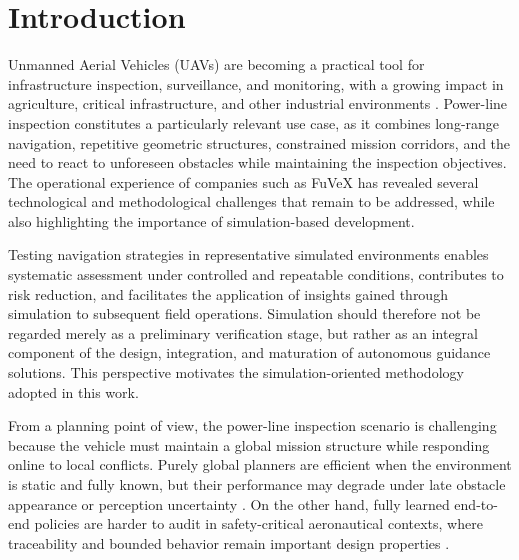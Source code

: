 \documentclass[electronics,article,submit,moreauthors]{Definitions/mdpi}
\DeclareRobustCommand{\deleted}[1]{}%
\DeclareRobustCommand{\added}[1]{#1}%
\DeclareRobustCommand{\deleted}[1]{\textcolor{black}{\sout{#1}}}
\DeclareRobustCommand{\added}[1]{\textcolor{green!50!black}{#1}}
\def\deleted#1{}%
\def\added#1{#1}%
\begin{document}
\section{Introduction}

Unmanned Aerial Vehicles (UAVs) are becoming a practical tool for infrastructure inspection, surveillance, and monitoring, with a growing impact in agriculture, critical infrastructure, and other industrial environments \cite{imran2025environmental,marut2024surveillance}. Power-line inspection constitutes a particularly relevant use case, as it combines long-range navigation, repetitive geometric structures, constrained mission corridors, and the need to react to unforeseen obstacles while maintaining the inspection objectives. The operational experience of companies such as FuVeX has revealed several technological and methodological challenges that remain to be addressed, while also highlighting the importance of simulation-based development.

Testing navigation strategies in representative simulated environments enables systematic assessment under controlled and repeatable conditions, contributes to risk reduction, and facilitates the application of insights gained through simulation to subsequent field operations. Simulation should therefore not be regarded merely as a preliminary verification stage, but rather as an integral component of the design, integration, and maturation of autonomous guidance solutions. This perspective motivates the simulation-oriented methodology adopted in this work.

From a planning point of view, the \deleted{Powerline Inspection}\added{power-line inspection} scenario is \deleted{difficult}\added{challenging} because the vehicle must maintain a global mission structure while responding online to local conflicts. Purely global planners are efficient when the environment is static and fully known, but their performance may degrade under late obstacle appearance or perception uncertainty \cite{debnath2024review,meng2025advances}. On the other hand, fully learned end-to-end policies are harder to audit in safety-critical aeronautical contexts, where traceability and bounded behavior remain important design properties \cite{EASA_AI_Roadmap_2.0}.
\end{document}
